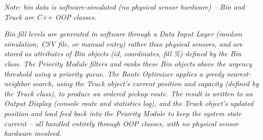 \documentclass[11pt,a4paper]{article}
\begin{document}
{\begin{minipage}[t]{\dimexpr\textwidth-2\fboxsep-2\fboxrule\relax}
\begin{center}
{
}
\end{center}

\vspace{3mm}

\begin{center}
\textit{\fontsize{8}{10}\selectfont
Note: bin data is software-simulated (no physical sensor hardware)
-- Bin and Truck are C++ OOP classes.}
\end{center}

\vspace{2mm}

\noindent
\textit{
Bin fill levels are generated in software through a Data Input Layer
(random simulation, CSV file, or manual entry) rather than physical
sensors, and are stored as attributes of Bin objects (id, coordinates,
fill \%) defined by the Bin class. The Priority Module filters and ranks
these Bin objects above the urgency threshold using a priority queue.
The Route Optimizer applies a greedy nearest-neighbor search, using the
Truck object's current position and capacity (defined by the Truck class),
to produce an ordered pickup route. The result is written to an Output
Display (console route and statistics log), and the Truck object's updated
position and load feed back into the Priority Module to keep the system
state current -- all handled entirely through OOP classes, with no physical
sensor hardware involved.
}

\vspace{6mm}

\end{minipage}
}
\end{document}
